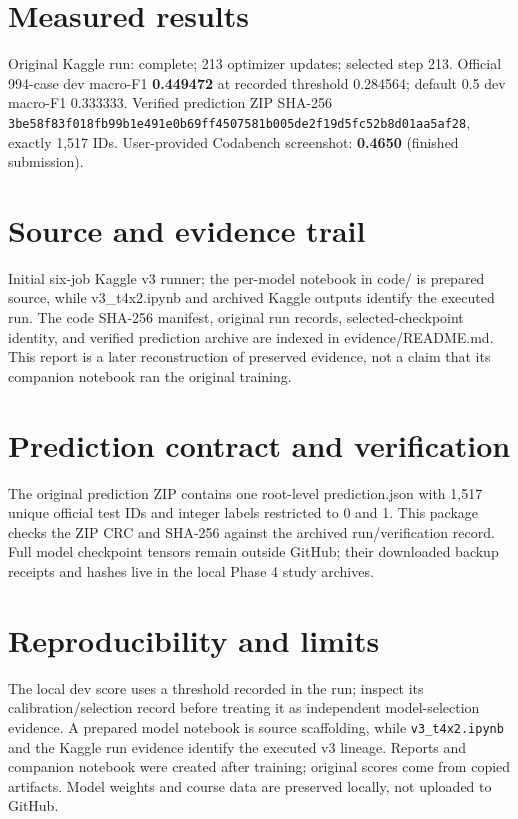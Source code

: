 \documentclass[11pt,a4paper]{article}
\begin{document}
\section{Measured results}
Original Kaggle run: complete; 213 optimizer updates; selected step 213. Official 994-case dev macro-F1 \textbf{0.449472} at recorded threshold 0.284564; default 0.5 dev macro-F1 0.333333. Verified prediction ZIP SHA-256 \texttt{3be58f83f018fb99b1e491e0b69ff4507581b005de2f19d5fc52b8d01aa5af28}, exactly 1,517 IDs. User-provided Codabench screenshot: \textbf{0.4650} (finished submission).
\section{Source and evidence trail}
Initial six-job Kaggle v3 runner; the per-model notebook in code/ is prepared source, while v3\_t4x2.ipynb and archived Kaggle outputs identify the executed run. The code SHA-256 manifest, original run records, selected-checkpoint identity, and verified prediction archive are indexed in evidence/README.md. This report is a later reconstruction of preserved evidence, not a claim that its companion notebook ran the original training.
\section{Prediction contract and verification}
The original prediction ZIP contains one root-level prediction.json with 1,517 unique official test IDs and integer labels restricted to 0 and 1. This package checks the ZIP CRC and SHA-256 against the archived run/verification record. Full model checkpoint tensors remain outside GitHub; their downloaded backup receipts and hashes live in the local Phase 4 study archives.
\section{Reproducibility and limits}
The local dev score uses a threshold recorded in the run; inspect its calibration/selection record before treating it as independent model-selection evidence. A prepared model notebook is source scaffolding, while \texttt{v3\_t4x2.ipynb} and the Kaggle run evidence identify the executed v3 lineage. Reports and companion notebook were created after training; original scores come from copied artifacts. Model weights and course data are preserved locally, not uploaded to GitHub.
\end{document}
